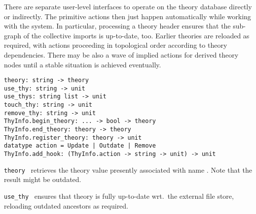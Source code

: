 \begin{isabellebody}
\begin{isamarkuptext}
  \medskip There are separate user-level interfaces to operate on the
  theory database directly or indirectly.  The primitive actions then
  just happen automatically while working with the system.  In
  particular, processing a theory header  ensures that the
  sub-graph of the collective imports 
  is up-to-date, too.  Earlier theories are reloaded as required, with
   actions proceeding in topological order according to
  theory dependencies.  There may be also a wave of implied  actions for derived theory nodes until a stable situation
  is achieved eventually.%
\end{isamarkuptext}%
\isamarkuptrue%
%
\isadelimmlref
%
\endisadelimmlref
%
\isatagmlref
%
\begin{isamarkuptext}%
\begin{mldecls}
  \verb|theory: string -> theory| \\
  \verb|use_thy: string -> unit| \\
  \verb|use_thys: string list -> unit| \\
  \verb|touch_thy: string -> unit| \\
  \verb|remove_thy: string -> unit| \\[1ex]
  \verb|ThyInfo.begin_theory|\verb|: ... -> bool -> theory| \\
  \verb|ThyInfo.end_theory: theory -> theory| \\
  \verb|ThyInfo.register_theory: theory -> unit| \\[1ex]
  \verb|datatype action = Update |\verb,|,\verb| Outdate |\verb,|,\verb| Remove| \\
  \verb|ThyInfo.add_hook: (ThyInfo.action -> string -> unit) -> unit| \\
  \end{mldecls}

  \begin{description}

  \item \verb|theory|~ retrieves the theory value presently
  associated with name .  Note that the result might be
  outdated.

  \item \verb|use_thy|~ ensures that theory  is fully
  up-to-date wrt.\ the external file store, reloading outdated
  ancestors as required.


\end{description}
\end{isamarkuptext}
\end{isabellebody}
